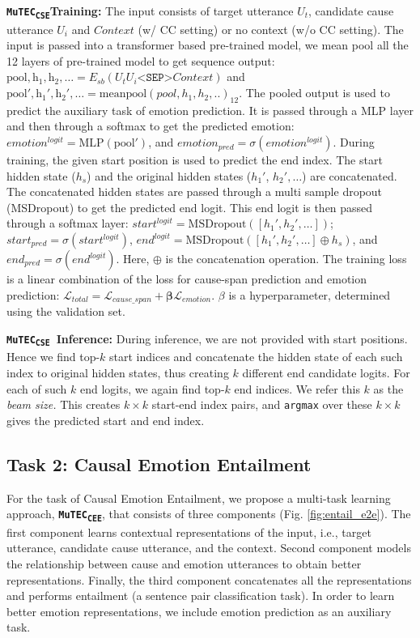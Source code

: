 \documentclass{article}
\newcommand{\subone}{\textbf{\texttt{MuTEC\textsubscript{CSE}}}}
\newcommand{\subtwo}{\textbf{\texttt{MuTEC\textsubscript{CEE}}}}
\begin{document}
\noindent\textbf{\subone Training:} The input consists of target utterance $U_t$, candidate cause utterance $U_i$ and $Context$ (w/ CC setting) or no context (w/o CC setting). The input is passed into a transformer based pre-trained model, we mean pool all the 12 layers of pre-trained model to get sequence output: $\mathrm{pool, h_1, h_2,\ldots} = E_{sb}(U_t U_i \texttt{<SEP>} \textit{Context})$ and $\mathrm{pool', h_1', h_2',\ldots} = \mathrm{meanpool}(pool, h_1, h_2,..)_{12}$. The pooled output is used to predict the auxiliary task of emotion prediction. It is passed through a MLP layer and then through a softmax to get the predicted emotion: $ emotion^{logit} = \mathrm{MLP}(\mathrm{pool'})$, and $emotion_{pred} = \sigma(emotion^{logit})$. During training, the given start position is used to predict the end index. The start hidden state ($h_s$) and the original hidden states ($h_1'$, $h_2', \ldots$) are concatenated. The  concatenated hidden states are passed through a multi sample dropout (MSDropout) \cite{inoue2019multi} to get the predicted end logit. This end logit is then passed through a softmax layer: $start^{logit} = \mathrm{MSDropout}([h_1', h_2', \ldots])$; $start_{pred} = \sigma(start^{logit})$, $end^{logit} = \mathrm{MSDropout}([h_1', h_2', \ldots]\oplus h_s)$, and $end_{pred} = \sigma(end^{logit})$. Here, $\oplus$ is the concatenation operation. The training loss is a linear combination of the loss for cause-span prediction and emotion prediction: $\mathcal{L}_{total} = \mathcal{L}_{cause\_span} + \mathbf{\beta}\mathcal{L}_{emotion}$. $\beta$ is a hyperparameter, determined using the validation set.


{\label{sec:mutec_infer}
\noindent\textbf{\subone\ Inference:} During inference, we are not provided with start positions. Hence we find top-$k$ start indices and concatenate the hidden state of each such index to original hidden states, thus creating $k$ different end candidate logits. For each of such $k$ end logits, we again find top-$k$ end indices. We refer this $k$ as the \textit{beam size.} This creates $k \times k$ start-end index pairs, and \texttt{argmax} over these $k \times k$ gives the predicted start and end index.}

\subsection{Task 2: Causal Emotion Entailment}
\vspace{-3mm}
For the task of Causal Emotion Entailment, we propose a multi-task learning approach, \subtwo, that consists of three components (Fig. \ref{fig:entail_e2e}). The first component learns contextual representations of the input, i.e., target utterance, candidate cause utterance, and the context. Second component models the relationship between cause and emotion utterances to obtain better representations. Finally, the third component concatenates all the representations and performs entailment (a sentence pair classification task). In order to learn better emotion representations, we include emotion prediction as an auxiliary task. 
\end{document}
